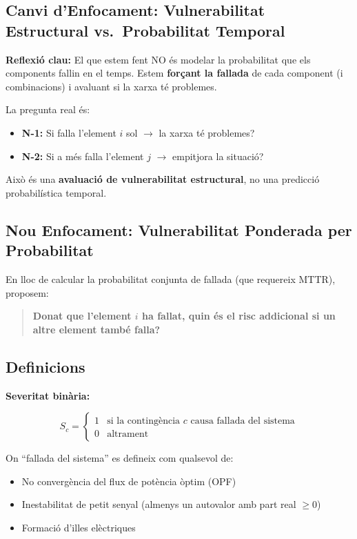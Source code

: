 \documentclass[11pt,a4paper]{article}
\begin{document}
\subsection{Canvi d'Enfocament: Vulnerabilitat Estructural vs.\ Probabilitat Temporal}

\textbf{Reflexió clau:} El que estem fent NO és modelar la probabilitat que els components fallin en el temps. Estem \textbf{forçant la fallada} de cada component (i combinacions) i avaluant si la xarxa té problemes.

La pregunta real és:
\begin{itemize}
    \item \textbf{N-1:} Si falla l'element $i$ sol $\rightarrow$ la xarxa té problemes?
    \item \textbf{N-2:} Si a més falla l'element $j$ $\rightarrow$ empitjora la situació?
\end{itemize}

Això és una \textbf{avaluació de vulnerabilitat estructural}, no una predicció probabilística temporal.

\subsection{Nou Enfocament: Vulnerabilitat Ponderada per Probabilitat}

En lloc de calcular la probabilitat conjunta de fallada (que requereix MTTR), proposem:

\begin{quote}
\textbf{Donat que l'element $i$ ha fallat, quin és el risc addicional si un altre element també falla?}
\end{quote}

\subsection{Definicions}

\textbf{Severitat binària:}

\begin{equation}
S_c = \begin{cases} 
1 & \text{si la contingència } c \text{ causa fallada del sistema} \\ 
0 & \text{altrament} 
\end{cases}
\end{equation}

On ``fallada del sistema'' es defineix com qualsevol de:
\begin{itemize}
    \item No convergència del flux de potència òptim (OPF)
    \item Inestabilitat de petit senyal (almenys un autovalor amb part real $\geq 0$)
    \item Formació d'illes elèctriques
\end{itemize}
\end{document}
